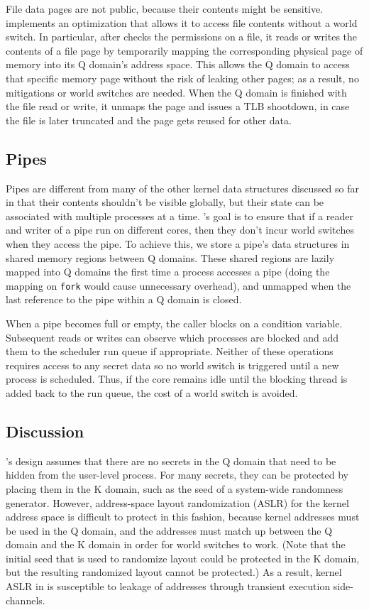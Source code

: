 File data pages are not public, because their contents might be sensitive.
\sys implements an optimization that allows it to access file
contents without a world switch.  In particular, after \sys checks
the permissions on a file, it reads or writes the contents of a file
page by temporarily mapping the corresponding physical page of memory
into its Q domain's address space.  This allows the Q domain to access
that specific memory page without the risk of leaking other pages;
as a result, no mitigations or world switches are needed.  When the Q
domain is finished with the file read or write, it unmaps the page and
issues a TLB shootdown, in case the file is later truncated and the page
gets reused for other data.


\subsection*{Pipes}

Pipes are different from many of the other kernel data structures discussed so
far in that their contents shouldn't be visible globally, but their state can be
associated with multiple processes at a time. \sys's goal is to ensure that if a
reader and writer of a pipe run on different cores, then they don't incur world
switches when they access the pipe. To achieve this, we store a pipe's data
structures in shared memory regions between Q domains. These shared regions are
lazily mapped into Q domains the first time a process accesses a pipe (doing the
mapping on \texttt{fork} would cause unnecessary overhead), and unmapped when
the last reference to the pipe within a Q domain is closed. 

When a pipe becomes full or empty, the caller blocks on a condition
variable. Subsequent reads or writes can observe which processes are blocked and
add them to the scheduler run queue if appropriate. Neither of these operations
requires access to any secret data so no world switch is triggered until a new
process is scheduled. Thus, if the core remains idle until the blocking thread
is added back to the run queue, the cost of a world switch is avoided.

\subsection*{Discussion}

\sys's design assumes that there are no secrets in the Q domain that
need to be hidden from the user-level process.  For many secrets, they
can be protected by placing them in the K domain, such as the seed
of a system-wide randomness generator.  However, address-space layout
randomization (ASLR) for the kernel address space is difficult to protect
in this fashion, because kernel addresses must be used in the Q domain,
and the addresses must match up between the Q domain and the K domain
in order for world switches to work.  (Note that the initial seed that
is used to randomize layout could be protected in the K domain, but the
resulting randomized layout cannot be protected.)  As a result, kernel
ASLR in \sys is susceptible to leakage of addresses through transient
execution side-channels.

